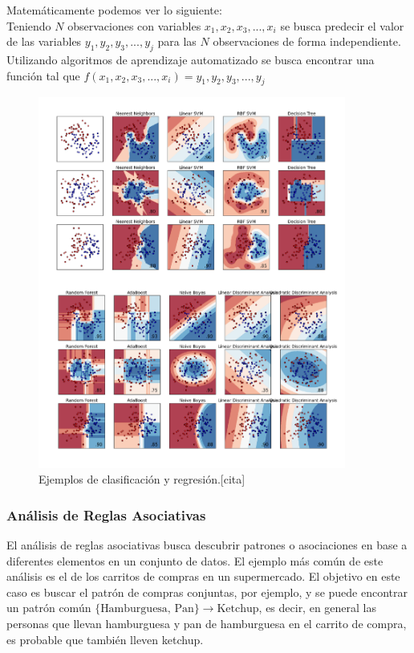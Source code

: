 Matemáticamente podemos ver lo siguiente:\\
Teniendo $N$ observaciones con variables $x_1, x_2, x_3, ... , x_i$ se busca predecir el valor de las variables $y_1, y_2, y_3, ... , y_j$ para las $N$ observaciones de forma independiente.
Utilizando algoritmos de aprendizaje automatizado se busca encontrar una función tal que
$f(x_1, x_2, x_3, ... , x_i) = y_1, y_2, y_3, ... , y_j$

\begin{figure}[H]
  \centering
    \includegraphics[width=0.9\textwidth]{Figuras/Clasificacion}
      \caption{Ejemplos de clasificación y regresión.[cita]}
    \label{fig:clasificacion}
\end{figure}
 

\subsubsection{Análisis de Reglas Asociativas}
El análisis de reglas asociativas busca descubrir patrones o asociaciones en base a diferentes elementos en un conjunto de datos. El ejemplo más común de este análisis es el de los carritos de compras en un supermercado. El objetivo en este caso es buscar el patrón de compras conjuntas, por ejemplo, y se puede encontrar un patrón común $\{\textrm{Hamburguesa, Pan}\} \to \textrm{Ketchup}$, es decir, en general las personas que llevan hamburguesa y pan de hamburguesa en el carrito de compra, es probable que también lleven ketchup. 

